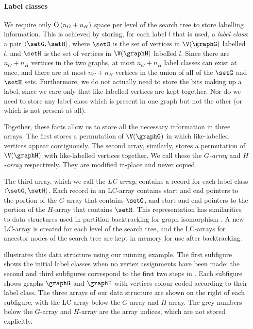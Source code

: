 \paragraph{Label classes} We require only $\operatorname{O}\left(n_G+n_H\right)$ space per level of
the search tree to store labelling information.  This is achieved by storing,
for each label $l$ that is used, a
\emph{label class}: a pair $\langle \setG,\setH \rangle$,
where $\setG$ is the set of vertices in $\V(\graphG)$ labelled
$l$, and $\setH$ is the set of vertices in $\V(\graphH)$ labelled $l$. Since
there are $n_G + n_H$ vertices in the two graphs, at most $n_G + n_H$ label
classes can exist at once, and there are at most $n_G + n_H$ vertices in the
union of all of the $\setG$ and $\setH$ sets. Furthermore, we do not actually
need to store the bits making up a label, since we care only that like-labelled
vertices are kept together. Nor do we need to store any label class which is
present in one graph but not the other (or which is not present at all).

Together, these facts allow us to store all the
necessary information in three arrays.  The first 
stores a permutation of $\V(\graphG)$ in which like-labelled vertices appear
contiguously.  The second array, similarly, stores a permutation
of $\V(\graphH)$ with like-labelled vertices together.  We call these
the \emph{$G$-array} and \emph{$H$-array} respectively.  They are modified
in-place and never copied.

The third array,
which we call the \emph{LC-array},
contains a record for each label class $\langle \setG,\setH \rangle$.
Each
record in an LC-array contains start and end pointers to the portion of the
$G$-array that contains $\setG$, and start and end pointers to the portion
of the $H$-array that contains $\setH$.
This representation has
similarities to data structures used in partition backtracking for graph isomorphism
\citep{DBLP:journals/jsc/McKayP14,DBLP:conf/wea/Lopez-PresaA09}.
A new LC-array is created for each level of the search tree, and the LC-arrays
for ancestor nodes of the search tree are kept in memory for use after
backtracking.

 illustrates this data structure using our running example.
The first subfigure shows the initial label classes when no vertex assignments have
been made; the second and third subfigures correspond to the first two steps in .
Each subfigure shows graphs $\graphG$ and $\graphH$ with vertices colour-coded according
to their label class.  The three arrays of our data structure are shown on the right of each subfigure,
with the LC-array below the $G$-array and $H$-array.  The grey numbers below the $G$-array and $H$-array
are the array indices, which are not stored explicitly.

